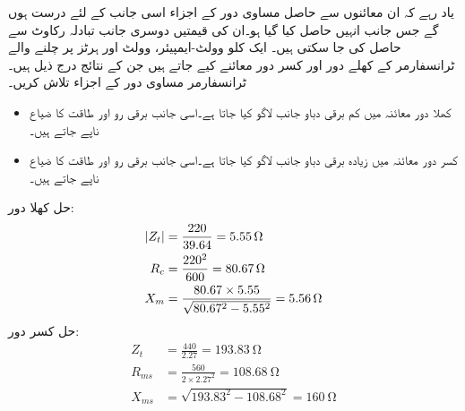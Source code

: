 یاد رہے کہ ان معائنوں سے حاصل مساوی دور کے  اجزاء اسی جانب کے لئے درست ہوں گے جس جانب انہیں حاصل کیا گیا ہو۔ان کی قیمتیں دوسری جانب تبادلہ رکاوٹ سے حاصل کی جا سکتی ہیں۔ 
%
ایک   کلو وولٹ-ایمپیئر،  وولٹ اور  ہرٹز پر چلنے والے ٹرانسفارمر کے کھلے دور اور کسر دور معائنے کیے جاتے ہیں جن کے نتائج درج ذیل ہیں۔ ٹرانسفارمر مساوی دور کے اجزاء تلاش کریں۔
\begin{itemize}
\item
کھلا دور معائنہ میں کم برقی دباو جانب   لاگو کیا جاتا ہے۔اسی جانب برقی رو  اور طاقت کا ضیاع  ناپے جاتے ہیں۔
\item
کسر دور معائنہ میں زیادہ برقی دباو جانب   لاگو کیا جاتا ہے۔اسی جانب برقی رو  اور طاقت کا ضیاع  ناپے جاتے ہیں۔
\end{itemize}

حل کھلا دور:
\begin{align*}
\abs{Z_t}&=\frac{220}{39.64}=\SI{5.55}{\ohm}\\
R_c&=\frac{220^2}{600}=\SI{80.67}{\ohm}\\
X_m&=\frac{80.67 \times 5.55}{\sqrt{80.67^2-5.55^2}}=\SI{5.56}{\ohm}
\end{align*}
حل کسر دور:
\begin{align*}
Z_t&=\frac{440}{2.27}=\SI{193.83}{\ohm}\\
R_{ms}&=\frac{560}{2 \times 2.27^2}=\SI{108.68}{\ohm}\\
X_{ms}&=\sqrt{193.83^2-108.68^2}=\SI{160}{\ohm}
\end{align*}

